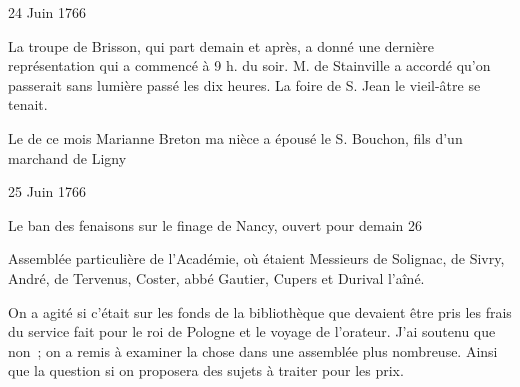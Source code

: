                      
                     \begin{diary}{24 Juin 1766}{}
                        
                         La troupe de Brisson, qui part demain et
                           après, a donné une dernière représentation
                           qui a commencé à 9 h. du soir. M. de
                              Stainville
                           a accordé qu'on passerait sans lumière passé les
                           dix heures. La foire de S. Jean le
                              vieil-âtre
                           se
                           tenait. \bigskip
        
        
                         Le  de ce mois Marianne Breton
                           ma nièce a épousé le S. 
                              Bouchon, fils d'un marchand de Ligny
                        \bigskip
        
        
                     \end{diary}

                     \begin{diary}{25 Juin 1766}{}
                        
                         Le ban des fenaisons sur le finage
                           de Nancy, ouvert pour demain 26
                        \bigskip
        
        
                         Assemblée particulière de l'Académie, où étaient
                           Messieurs
                           de Solignac,
                           de Sivry, André, de Tervenus,
                           Coster, abbé Gautier, Cupers et
                              Durival l'aîné.
                        \bigskip
        
        
                         On a agité si c'était sur les
                           fonds de la bibliothèque
                           que devaient être pris les frais du service fait
                           pour le roi de Pologne et le voyage de l'orateur. J'ai
                           soutenu que non ; on a remis à examiner la
                           chose dans une assemblée plus nombreuse.
                           Ainsi que la question si on proposera des
                           sujets à traiter pour les prix. \bigskip
        
        
                     \end{diary}

